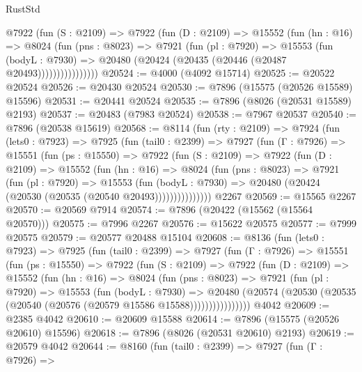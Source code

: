 \begin{lexlean}{RustStd}
\begin{coremodule}
              @7922
                (fun (S : @2109) =>
                @7922
                  (fun (D : @2109) =>
                  @15552
                    (fun (hn : @16) =>
                    @8024
                      (fun (pns : @8023) =>
                      @7921
                        (fun (pl : @7920) =>
                        @15553
                          (fun (bodyL : @7930) =>
                          @20480 (@20424 (@20435 (@20446 (@20487 @20493))))))))))))))))
@20524 := @4000 (@4092 @15714)
@20525 := @20522 @20524
@20526 := @20430 @20524
@20530 := @7896 (@15575 (@20526 @15589) @15596)
@20531 := @20441 @20524
@20535 := @7896 (@8026 (@20531 @15589) @2193)
@20537 := @20483 (@7983 @20524)
@20538 := @7967 @20537
@20540 := @7896 (@20538 @15619)
@20568 := @8114
    (fun (rty : @2109) =>
    @7924
      (fun (lets0 : @7923) =>
      @7925
        (fun (tail0 : @2399) =>
        @7927
          (fun (Γ : @7926) =>
          @15551
            (fun (ps : @15550) =>
            @7922
              (fun (S : @2109) =>
              @7922
                (fun (D : @2109) =>
                @15552
                  (fun (hn : @16) =>
                  @8024
                    (fun (pns : @8023) =>
                    @7921
                      (fun (pl : @7920) =>
                      @15553
                        (fun (bodyL : @7930) =>
                        @20480 (@20424 (@20530 (@20535 (@20540 @20493)))))))))))))))
    @2267
@20569 := @15565 @2267
@20570 := @20569 @7914
@20574 := @7896 (@20422 (@15562 (@15564 @20570)))
@20575 := @7996 @2267
@20576 := @15622 @20575
@20577 := @7999 @20575
@20579 := @20577 @20488 @15104
@20608 := @8136
    (fun (lets0 : @7923) =>
    @7925
      (fun (tail0 : @2399) =>
      @7927
        (fun (Γ : @7926) =>
        @15551
          (fun (ps : @15550) =>
          @7922
            (fun (S : @2109) =>
            @7922
              (fun (D : @2109) =>
              @15552
                (fun (hn : @16) =>
                @8024
                  (fun (pns : @8023) =>
                  @7921
                    (fun (pl : @7920) =>
                    @15553
                      (fun (bodyL : @7930) =>
                      @20480
                        (@20574
                          (@20530 (@20535 (@20540 (@20576 (@20579 @15586 @15588))))))))))))))))
    @4042
@20609 := @2385 @4042
@20610 := @20609 @15588
@20614 := @7896 (@15575 (@20526 @20610) @15596)
@20618 := @7896 (@8026 (@20531 @20610) @2193)
@20619 := @20579 @4042
@20644 := @8160
    (fun (tail0 : @2399) =>
    @7927
      (fun (Γ : @7926) =>

\end{coremodule}
\end{lexlean}

